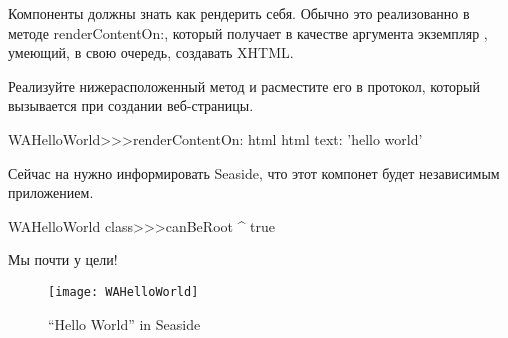 \documentclass[a4paper,10pt,twoside]{book}
\begin{document}
Компоненты должны знать как рендерить себя.
Обычно это реализованно в методе 
{renderContentOn:},
который получает в качестве аргумента экземпляр , умеющий, в свою очередь, создавать XHTML.



Реализуйте нижерасположенный метод и расместите его в протокол, который вызывается при создании веб-страницы.

\begin{code}{}
WAHelloWorld>>>renderContentOn: html
	html text: 'hello world'
\end{code}


\noindent
Сейчас на нужно информировать Seaside,
что этот компонет будет независимым приложением.


\begin{code}{}
WAHelloWorld class>>>canBeRoot
	^ true
\end{code}


\noindent
Мы почти у цели!



\begin{figure}[htb]
\begin{center}
\texttt{[image: WAHelloWorld]}
\caption{``Hello World'' in Seaside}
\end{center}
\end{figure}
\end{document}
